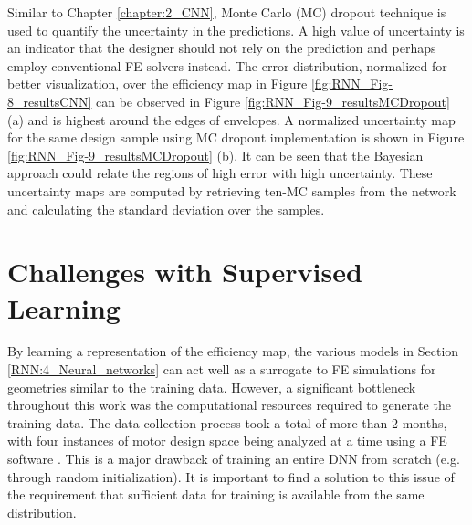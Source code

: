Similar to Chapter \ref{chapter:2_CNN}, Monte Carlo (MC) dropout technique is used to quantify the uncertainty in the predictions. A high value of uncertainty  is an indicator that the designer should not rely on the prediction and perhaps employ conventional FE solvers instead. The error distribution, normalized for better visualization, over the efficiency map in Figure \ref{fig:RNN_Fig-8_resultsCNN} can be observed in Figure \ref{fig:RNN_Fig-9_resultsMCDropout} (a) and is highest around the edges of envelopes. A normalized uncertainty map for the same design sample using MC dropout implementation is shown in Figure \ref{fig:RNN_Fig-9_resultsMCDropout} (b). It can be seen that the  Bayesian approach could relate the regions of high error with high uncertainty. These uncertainty maps are computed by retrieving ten-MC samples from the network and calculating the standard deviation over the samples.

\section{Challenges with Supervised Learning}\label{RNN:6_Challenges_SL}

By learning a representation of the efficiency map, the various models in Section \ref{RNN:4_Neural_networks} can act well as a surrogate to FE simulations for geometries similar to the training data. However, a significant bottleneck throughout this work was the computational resources required to generate the training data. The data collection process took a total of more than 2 months, with four instances of motor design space being analyzed at a time using a FE software \parencite{mentor_motorsolve}. This is a major drawback of training an entire DNN from scratch (e.g. through random initialization). It is important to find a solution to this issue of the requirement that sufficient data for training is available from the same distribution. 

